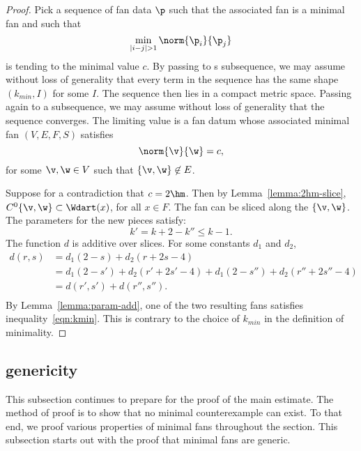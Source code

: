 \begin{proof} 
  Pick a sequence of fan data $\p$ such that the associated fan is a
  minimal fan and such that
\begin{displaymath}
\min_{|i-j|>1} \norm{\p_i}{\p_j}
\end{displaymath}
is tending to the minimal value $c$.  By passing to s subsequence, we
may assume without loss of generality that every term in the sequence
has the same shape $(k_{min},I)$ for some $I$.  The sequence then lies
in a compact metric space.  Passing again to a subsequence, we may
assume without loss of generality that the sequence converges.  The
limiting value is a fan datum whose associated minimal fan $(V,E,F,S)$
satisfies
\begin{displaymath}
\norm{\v}{\w}=c,
\end{displaymath}
for some $\v,\w\in V$ such that $\{\v,\w\}\not\in E$.

Suppose for a contradiction that $c=2\hm$.  Then by
Lemma~\ref{lemma:2hm-slice}, $C^0\{\v,\w\}\subset \Wdart(x)$, for all
$x\in F$.  The fan can be sliced along the $\{\v,\w\}$.  The
parameters for the new pieces satisfy:
\begin{displaymath}
k' = k+2 - k'' \le k-1.
\end{displaymath}
The function $d$ is additive over slices.  For some constants $d_1$
and $d_2$,
\begin{equation}\label{eqn:drs}
\begin{array}{lll}
d(r,s) &= d_1 (2 - s) + d_2 (r + 2 s-4) \\
&= d_1 (2-s') + d_2 (r'+2 s'-4) + d_1 (2-s'') + d_2 (r''+2s''-4)\\
&= d(r',s') + d(r'',s''). \\
\end{array}
\end{equation}
By Lemma~\ref{lemma:param-add}, one of the two resulting fans
satisfies inequality~\ref{eqn:kmin}.  This is contrary to the choice
of $k_{min}$ in the definition of minimality.
\end{proof}





\subsection{genericity}

This subsection continues to prepare for the proof of the main
estimate.  The method of proof is to show that no minimal
counterexample can exist.  To that end, we proof various properties of
minimal fans throughout the section.  This subsection starts out with
the proof that minimal fans are generic.

